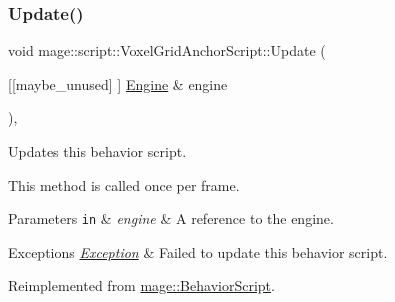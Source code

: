 \subsubsection{\texorpdfstring{Update()}{Update()}}
{\footnotesize\ttfamily void mage\+::script\+::\+Voxel\+Grid\+Anchor\+Script\+::\+Update (\begin{DoxyParamCaption}\item[{\mbox{[}\mbox{[}maybe\+\_\+unused\mbox{]} \mbox{]} \mbox{\hyperlink{classmage_1_1_engine}{Engine}} \&}]{engine }\end{DoxyParamCaption})\hspace{0.3cm}{\ttfamily [override]}, {\ttfamily [virtual]}}

Updates this behavior script.

This method is called once per frame.


\begin{DoxyParams}[1]{Parameters}
\mbox{\tt in}  & {\em engine} & A reference to the engine. \\
\hline
\end{DoxyParams}

\begin{DoxyExceptions}{Exceptions}
{\em \mbox{\hyperlink{classmage_1_1_exception}{Exception}}} & Failed to update this behavior script. \\
\hline
\end{DoxyExceptions}


Reimplemented from \mbox{\hyperlink{classmage_1_1_behavior_script_a085634661326b59850c1111e537baa4e}{mage\+::\+Behavior\+Script}}.

